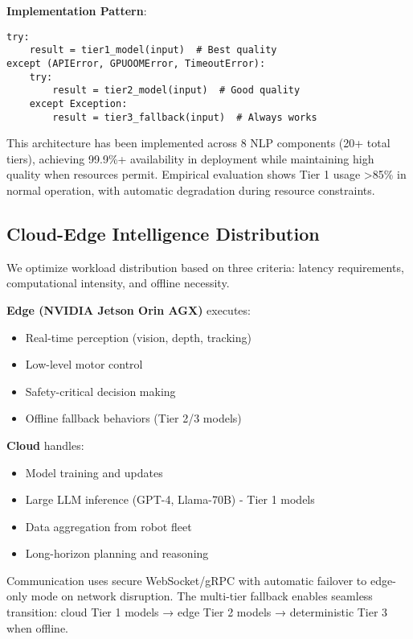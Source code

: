 \documentclass[conference]{IEEEtran}
\begin{document}
\textbf{Implementation Pattern}:
\begin{verbatim}
try:
    result = tier1_model(input)  # Best quality
except (APIError, GPUOOMError, TimeoutError):
    try:
        result = tier2_model(input)  # Good quality
    except Exception:
        result = tier3_fallback(input)  # Always works
\end{verbatim}

This architecture has been implemented across 8 NLP components (20+ total tiers), achieving 99.9\%+ availability in deployment while maintaining high quality when resources permit. Empirical evaluation shows Tier 1 usage >85\% in normal operation, with automatic degradation during resource constraints.

\subsection{Cloud-Edge Intelligence Distribution}

We optimize workload distribution based on three criteria: latency requirements, computational intensity, and offline necessity.

\textbf{Edge (NVIDIA Jetson Orin AGX)} executes:
\begin{itemize}
    \item Real-time perception (vision, depth, tracking)
    \item Low-level motor control
    \item Safety-critical decision making
    \item Offline fallback behaviors (Tier 2/3 models)
\end{itemize}

\textbf{Cloud} handles:
\begin{itemize}
    \item Model training and updates
    \item Large LLM inference (GPT-4, Llama-70B) - Tier 1 models
    \item Data aggregation from robot fleet
    \item Long-horizon planning and reasoning
\end{itemize}

Communication uses secure WebSocket/gRPC with automatic failover to edge-only mode on network disruption. The multi-tier fallback enables seamless transition: cloud Tier 1 models → edge Tier 2 models → deterministic Tier 3 when offline.

\end{document}

